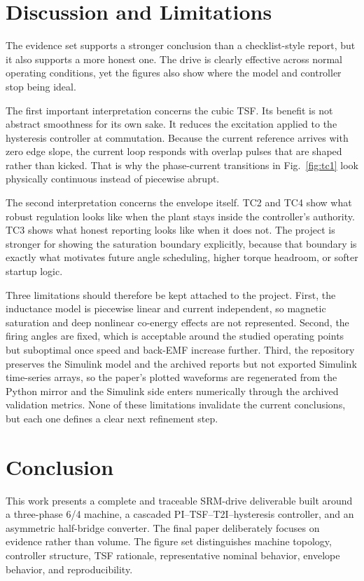 \documentclass[conference]{IEEEtran}
\begin{document}
\section{Discussion and Limitations}
The evidence set supports a stronger conclusion than a checklist-style report, but it also supports a more honest one.
The drive is clearly effective across normal operating conditions, yet the figures also show where the model and controller stop being ideal.

The first important interpretation concerns the cubic TSF.
Its benefit is not abstract smoothness for its own sake.
It reduces the excitation applied to the hysteresis controller at commutation.
Because the current reference arrives with zero edge slope, the current loop responds with overlap pulses that are shaped rather than kicked.
That is why the phase-current transitions in Fig.~\ref{fig:tc1} look physically continuous instead of piecewise abrupt.

The second interpretation concerns the envelope itself.
TC2 and TC4 show what robust regulation looks like when the plant stays inside the controller's authority.
TC3 shows what honest reporting looks like when it does not.
The project is stronger for showing the saturation boundary explicitly, because that boundary is exactly what motivates future angle scheduling, higher torque headroom, or softer startup logic.

Three limitations should therefore be kept attached to the project.
First, the inductance model is piecewise linear and current independent, so magnetic saturation and deep nonlinear co-energy effects are not represented.
Second, the firing angles are fixed, which is acceptable around the studied operating points but suboptimal once speed and back-EMF increase further.
Third, the repository preserves the Simulink model and the archived reports but not exported Simulink time-series arrays, so the paper's plotted waveforms are regenerated from the Python mirror and the Simulink side enters numerically through the archived validation metrics.
None of these limitations invalidate the current conclusions, but each one defines a clear next refinement step.

\section{Conclusion}
This work presents a complete and traceable SRM-drive deliverable built around a three-phase 6/4 machine, a cascaded PI--TSF--T2I--hysteresis controller, and an asymmetric half-bridge converter.
The final paper deliberately focuses on evidence rather than volume.
The figure set distinguishes machine topology, controller structure, TSF rationale, representative nominal behavior, envelope behavior, and reproducibility.
\end{document}
